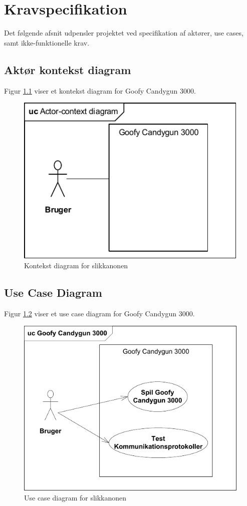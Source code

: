 
\renewcommand{\labelenumii}{\theenumii}
\renewcommand{\theenumii}{\theenumi.\arabic{enumii}.}
\chapter{Kravspecifikation}
\label{afsnit:kravspecifikation}
Det følgende afsnit udpensler projektet ved specifikation af aktører, use cases, samt ikke-funktionelle krav.

\section{Aktør kontekst diagram}
Figur \ref{ref:kontekstDiagram} viser et kontekst diagram for Goofy Candygun 3000.
\begin{figure}[H]
	\centering
	\includegraphics[]{Kravspecifikation/images/kontekstDiagram}
	\caption{Kontekst diagram for slikkanonen}
	\label{ref:kontekstDiagram}
\end{figure}

\section{Use Case Diagram}
Figur \ref{ref:usecaseDiagram} viser et use case diagram for Goofy Candygun 3000.
\begin{figure}[H]
	\centering
	\includegraphics[width = 0.7 \textwidth]{Kravspecifikation/images/usecaseDiagram}
	\caption{Use case diagram for slikkanonen}
	\label{ref:usecaseDiagram}
\end{figure}

